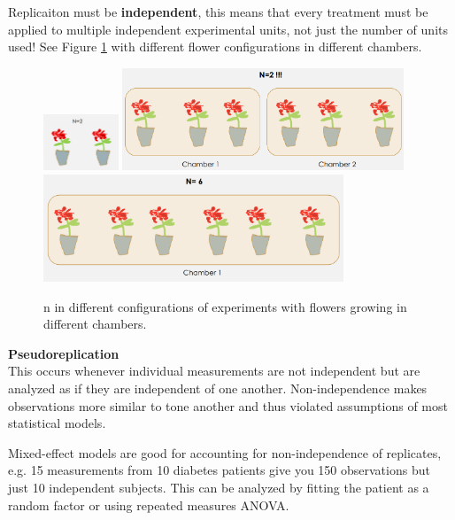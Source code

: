 \documentclass{article}
\begin{document}
Replicaiton must be \textbf{independent}, this means that every treatment must be applied to multiple independent experimental units, not just the number of units used! See Figure \ref{flowers} with different flower configurations in different chambers.
\begin{figure}[h]
\centering
\label{flowers}
\includegraphics[width = 0.2\textwidth]{exp-design/replicationplant.png}
\includegraphics[width = 0.75\textwidth]{exp-design/replicationplants2.png}
\includegraphics[width = 0.8\textwidth]{exp-design/replicationplants6.png}
\caption{n in different configurations of experiments with flowers growing in different chambers.}
\end{figure}

\textbf{Pseudoreplication} \\
This occurs whenever individual measurements are not independent but are analyzed as if they are independent of one another. Non-independence makes observations more similar to tone another and thus violated assumptions of most statistical models.\par 
Mixed-effect models are good for accounting for non-independence of replicates, e.g. 15 measurements from 10 diabetes patients give you 150 observations but just 10 independent subjects. This can be analyzed by fitting the patient as a random factor or using repeated measures ANOVA.\par 
\end{document}
